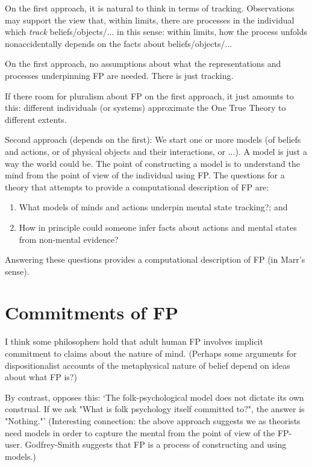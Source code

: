 \documentclass[12pt,\papersize]{extarticle}
\begin{document}
On the first approach, it is natural to think in terms of tracking.  Observations may support the view that, within limits, there are processes in the individual which \emph{track} beliefs/objects/... in this sense: within limits, how the process unfolds nonaccidentally depends on the facts about beliefs/objects/...  

On the first approach, no assumptions about what the representations and processes underpinning FP are needed. There is just tracking.

If there room for pluralism about FP on the first approach, it just amounts to this: different individuals (or systems) approximate the One True Theory to different extents.

Second approach (depends on the first): We start one or more models (of beliefs and actions, or of physical objects and their interactions, or ...).  A model is just a way the world could be. 
The point of constructing a model is to understand the mind from the point of view of the individual using FP.
The questions for a theory that attempts to provide a computational description of FP are: 
\begin{enumerate}
\item What models of minds and actions underpin mental state tracking?; and 
\item How in principle could someone infer facts about actions and mental states from non-mental evidence?
\end{enumerate}
Answering these questions provides a computational description of FP (in Marr’s sense).



\section{Commitments of FP}
I think some philosophers hold that adult human FP involves implicit commitment to claims about the nature of mind.
(Perhaps some arguments for dispositionalist accounts of the metaphysical nature of belief depend on ideas about what FP is?)

By contrast, \citet[p.~10]{godfrey-smith:2005_folk} opposes this: ‘The folk-psychological model does not dictate its own construal. If we ask "What is folk psychology itself committed to?", the answer is "Nothing."’ (Interesting connection: the above approach suggests we as theorists need models in order to capture the mental from the point of view of the FP-user. Godfrey-Smith suggests that FP is a process of constructing and using models.)
\end{document}
